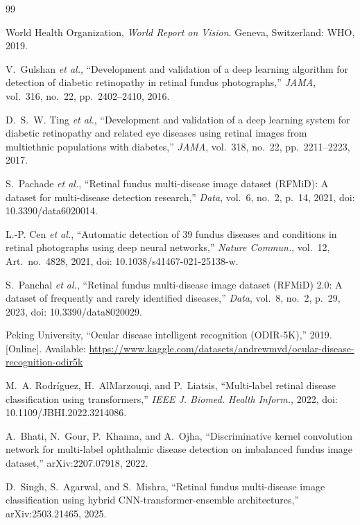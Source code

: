 \documentclass[conference]{IEEEtran}
\begin{document}
\begin{thebibliography}{99}
\footnotesize

World Health Organization, \emph{World Report on Vision}. Geneva, Switzerland: WHO, 2019.

V.~Gulshan \emph{et al.}, ``Development and validation of a deep learning algorithm for detection of diabetic retinopathy in retinal fundus photographs,'' \emph{JAMA}, vol.~316, no.~22, pp.~2402--2410, 2016.

D.~S.~W. Ting \emph{et al.}, ``Development and validation of a deep learning system for diabetic retinopathy and related eye diseases using retinal images from multiethnic populations with diabetes,'' \emph{JAMA}, vol.~318, no.~22, pp.~2211--2223, 2017.

S.~Pachade \emph{et al.}, ``Retinal fundus multi-disease image dataset (RFMiD): A dataset for multi-disease detection research,'' \emph{Data}, vol.~6, no.~2, p.~14, 2021, doi: 10.3390/data6020014.

L.-P. Cen \emph{et al.}, ``Automatic detection of 39 fundus diseases and conditions in retinal photographs using deep neural networks,'' \emph{Nature Commun.}, vol.~12, Art.~no.~4828, 2021, doi: 10.1038/s41467-021-25138-w.

S.~Panchal \emph{et al.}, ``Retinal fundus multi-disease image dataset (RFMiD) 2.0: A dataset of frequently and rarely identified diseases,'' \emph{Data}, vol.~8, no.~2, p.~29, 2023, doi: 10.3390/data8020029.

Peking University, ``Ocular disease intelligent recognition (ODIR-5K),'' 2019. [Online]. Available: \url{https://www.kaggle.com/datasets/andrewmvd/ocular-disease-recognition-odir5k}

M.~A. Rodr\'iguez, H.~AlMarzouqi, and P.~Liatsis, ``Multi-label retinal disease classification using transformers,'' \emph{IEEE J. Biomed. Health Inform.}, 2022, doi: 10.1109/JBHI.2022.3214086.

A.~Bhati, N.~Gour, P.~Khanna, and A.~Ojha, ``Discriminative kernel convolution network for multi-label ophthalmic disease detection on imbalanced fundus image dataset,'' arXiv:2207.07918, 2022.

D.~Singh, S.~Agarwal, and S.~Mishra, ``Retinal fundus multi-disease image classification using hybrid CNN-transformer-ensemble architectures,'' arXiv:2503.21465, 2025.


\end{thebibliography}
\end{document}
